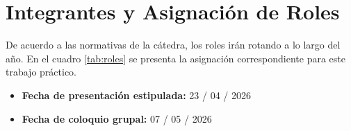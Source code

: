 \chapter{Integrantes y Asignación de Roles}
De acuerdo a las normativas de la cátedra, los roles irán rotando a lo largo del año. En el cuadro \ref{tab:roles} se presenta la asignación correspondiente para este trabajo práctico.

\begin{table}[H]
    \centering
    \caption{Tabla de asignación de roles del grupo.}
    \label{tab:roles}
\end{table}

\begin{itemize}
    \item \textbf{Fecha de presentación estipulada:} 23 / 04 / 2026 %
    \item \textbf{Fecha de coloquio grupal:} 07 / 05 / 2026 %
\end{itemize}